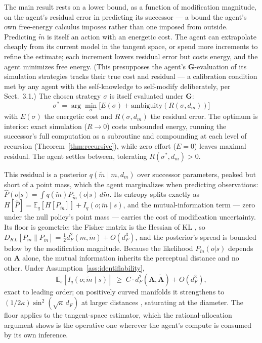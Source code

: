 \documentclass[runningheads]{llncs}
\begin{document}
The main result rests on a lower bound, as a function of modification magnitude, on the agent's residual error in predicting its successor --- a bound the agent's own free-energy calculus imposes rather than one imposed from outside. Predicting $\tilde{m}$ is itself an action with an energetic cost. The agent can extrapolate cheaply from its current model in the tangent space, or spend more increments to refine the estimate; each increment lowers residual error but costs  energy, and the agent minimizes free energy. (This presupposes the agent's $\mathbf{G}$-evaluation of its simulation strategies tracks their true cost and residual --- a calibration condition met by any agent with the self-knowledge to self-modify deliberately, per Sect.~3.1.) The chosen strategy $\sigma$ is itself evaluated under $\mathbf{G}$:
\begin{equation}
\sigma^* = \arg\min_\sigma \bigl[E(\sigma) + \mathrm{ambiguity}(R(\sigma, d_m))\bigr]
\end{equation}
with $E(\sigma)$ the energetic cost and $R(\sigma, d_m)$ the residual error. The optimum is interior: exact simulation ($R \to 0$) costs unbounded energy, running the successor's full computation as a subroutine and compounding at each level of recursion (Theorem~\ref{thm:recursive}), while zero effort ($E = 0$) leaves maximal residual. The agent settles between, tolerating $R(\sigma^*, d_m) > 0$.

This residual is a posterior $q(\tilde{m} \mid m, d_m)$ over successor parameters, peaked but short of a point mass, which the agent marginalizes when predicting observations: $\hat{P}(o|s) = \int q(\tilde{m}) P_{\tilde{m}}(o|s)\, d\tilde{m}$. Its entropy splits exactly as $H[\hat{P}] = \mathbb{E}_q[H[P_{\tilde{m}}]] + I_q(o; \tilde{m} \mid s)$, and the mutual-information term --- zero under the null policy's point mass --- carries the cost of modification uncertainty. Its floor is geometric: the Fisher matrix is the Hessian of KL \cite{amari2016}, so $D_{KL}[P_m \| P_{\tilde{m}}] = \tfrac{1}{2} d_F^2(m, \tilde{m}) + O(d_F^3)$, and the posterior's spread is bounded below by the modification magnitude. Because the likelihood $P_{\tilde m}(o|s)$ depends on $\mathbf{A}$ alone, the mutual information inherits the perceptual distance and no other. Under Assumption~\ref{ass:identifiability},
\begin{equation}
\label{eq:mi-floor}
\mathbb{E}_s\!\left[I_q(o; \tilde m \mid s)\right] \;\geq\; C \cdot d_F^2(\mathbf{A}, \tilde{\mathbf{A}}) + O(d_F^3),
\end{equation}
exact to leading order; on positively curved manifolds it strengthens to $(1/2\kappa)\sin^2(\sqrt{\kappa}\, d_F)$ at larger distances \cite{toponogov1959}, saturating at the diameter. The floor applies to the tangent-space estimator, which the rational-allocation argument shows is the operative one wherever the agent's compute is consumed by its own inference.
\end{document}
